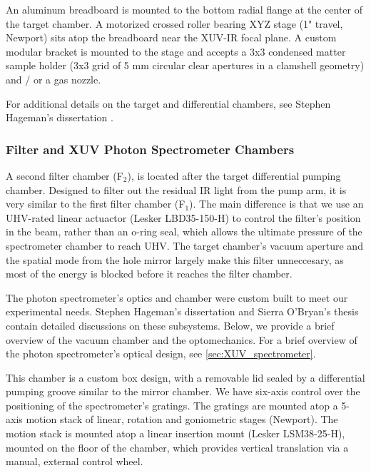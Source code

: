 An aluminum breadboard is mounted to the bottom radial flange at the center of the target chamber. A motorized crossed roller bearing XYZ stage (1" travel, Newport) sits atop the breadboard near the XUV-IR focal plane. A custom modular bracket is mounted to the stage and accepts a 3x3 condensed matter sample holder (3x3 grid of 5 mm circular clear apertures in a clamshell geometry) and / or a gas nozzle.

For additional details on the target and differential chambers, see Stephen Hageman's dissertation \cite{hagemanComplexAttosecondTransientAbsorption2020}.

\subsubsection{ Filter and XUV Photon Spectrometer Chambers}

A second filter chamber (F$_2$), is located after the target differential pumping chamber. Designed to filter out the residual IR light from the pump arm, it is very similar to the first filter chamber (F$_1$). The main difference is that we use an UHV-rated linear actuactor (Lesker LBD35-150-H) to control the filter's position in the beam, rather than an o-ring seal, which allows the ultimate pressure of the spectrometer chamber to reach UHV. The target chamber's vacuum aperture and the spatial mode from the hole mirror largely make this filter unneccesary, as most of the energy is blocked before it reaches the filter chamber.

The photon spectrometer's optics and chamber were custom built to meet our experimental needs. Stephen Hageman's dissertation \cite{hagemanComplexAttosecondTransientAbsorption2020} and Sierra O'Bryan's thesis \cite{obryanHighResolutionXUV2015} contain detailed discussions on these subsystems. Below, we provide a brief overview of the vacuum chamber and the optomechanics. For a brief overview of the photon spectrometer's optical design, see \cref{sec:XUV_spectrometer}.

This chamber is a custom box design, with a removable lid sealed by a differential pumping groove similar to the mirror chamber. We have six-axis control over the positioning of the spectrometer's gratings. The gratings are mounted atop a 5-axis motion stack of linear, rotation and goniometric stages (Newport). The motion stack is mounted atop a linear insertion mount (Lesker LSM38-25-H), mounted on the floor of the chamber, which provides vertical translation via a manual, external control wheel.

